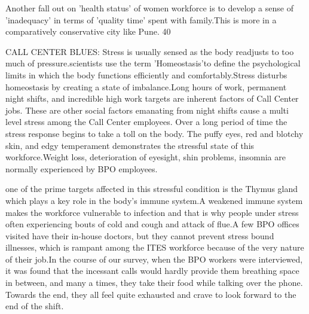 Another fall out on 'health status' of women workforce is to develop a sense of 'inadequacy' in terms of 'quality time' spent with family.This is more in a comparatively conservative city like Pune. 40%

CALL CENTER BLUES:
Stress is usually sensed as the body readjusts to too much of pressure.scientists use the term 'Homeostasis'to define the psychological limits in which the body functions efficiently and comfortably.Stress disturbs homeostasis by creating a state of imbalance.Long hours of work, permanent night shifts, and incredible high work targets are inherent factors of Call Center jobs. These are other social factors emanating from night shifts cause a multi level stress among the Call Center employees. Over a long period of time the stress response begins to take a toll on the body. The puffy eyes, red and blotchy skin, and edgy temperament demonstrates the stressful state of this workforce.Weight loss, deterioration of eyesight, shin problems, insomnia are normally experienced by BPO employees.

one of the prime targets affected in this stressful condition is the Thymus gland which plays a key role in the body's immune system.A weakened immune system makes the workforce vulnerable to infection and that is why people under stress often experiencing bouts of cold and cough and attack of flue.A few BPO offices visited have their in-house doctors, but they cannot prevent stress bound illnesses, which is rampant among the ITES workforce because of the very nature of their job.In the course of our survey, when the BPO workers were interviewed, it was found that the incessant calls would hardly provide them breathing space in between, and  many a times, they take their food while talking over the phone. Towards the end, they all feel quite exhausted and crave to look forward to the end of the shift.

